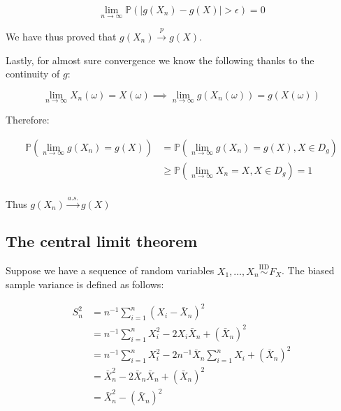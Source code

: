 \documentclass{report}
\begin{document}
\begin{equation}\label{eq:ex-lst-cmt-prob-proof-3}
    \lim_{n \to \infty} \mathbb{P}(|g(X_n) - g(X)| > \epsilon) = 0
\end{equation}

We have thus proved that $g(X_n) \overset{p}{\to} g(X)$. 

Lastly, for almost sure convergence we know the following thanks to the continuity of $g$:

\begin{equation}\label{eq:ex-lst-cmt-as-proof-1}
    \lim_{n\to\infty} X_n(\omega) = X(\omega) \implies \lim_{n\to\infty} g(X_n(\omega)) = g(X(\omega))
\end{equation}

Therefore:

\begin{equation}\label{eq:ex-lst-cmt-as-proof-2}
    \begin{aligned}
        \mathbb{P}\left(\lim_{n\to\infty} g(X_n) = g(X)\right)
          &= \mathbb{P}\left(\lim_{n\to\infty} g(X_n) = g(X), X \in D_g\right) \\
          &\geq \mathbb{P}\left(\lim_{n\to\infty} X_n = X, X \in D_g\right) = 1 \\
    \end{aligned}
\end{equation}

Thus $g(X_n) \overset{a.s.}{\to} g(X)$

\subsection{The central limit theorem}

Suppose we have a sequence of random variables $X_1, \dots, X_n \overset{\text{IID}}{\sim} F_X$. The biased sample variance is defined as follows:

\begin{equation}\label{eq:ex-lst-clt-proof-1}
    \begin{aligned}
        S^2_n 
          &= n^{-1} \sum_{i=1}^n \left(X_i - \bar{X}_n\right)^2 \\
          &= n^{-1} \sum_{i=1}^n X_i^2 - 2X_i\bar{X}_n + \left(\bar{X}_n\right)^2 \\
          &= n^{-1} \sum_{i=1}^n X_i^2 - 2n^{-1}\bar{X}_n \sum_{i=1}^n X_i + \left(\bar{X}_n\right)^2 \\
          &= \bar{X}^2_n - 2\bar{X}_n\bar{X}_n + \left(\bar{X}_n\right)^2 \\
          &= \bar{X}^2_n - \left(\bar{X}_n\right)^2 \\
    \end{aligned}
\end{equation}
\end{document}
